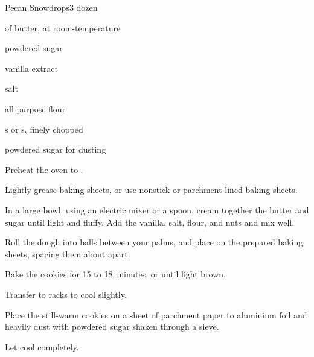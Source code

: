 \begin{recipe}{Pecan Snowdrops}{}{3 dozen}

\begin{ingredients}
\item \C{\threequarter} of butter, at room-temperature
\item \C{\third} powdered sugar
\item {} vanilla extract
\item \tp{\eighth} salt
\item \C{1 \half} all-purpose flour
\item \C{\threequarter}  s or s, finely chopped
\item powdered sugar for dusting
\end{ingredients}

\begin{directions}
\item Preheat the oven to .
\item Lightly grease baking sheets, or use nonstick or parchment-lined baking sheets.
\item In a large bowl, using an electric mixer or a spoon, cream together the butter and sugar until light and fluffy.  Add the vanilla, salt, flour, and nuts and mix well.
\item Roll the dough into \inch{\threequarter} balls between your palms, and place on the prepared baking sheets, spacing them about \inch{1 \half} apart.
\item Bake the cookies for 15 to 18~minutes, or until light brown.
\item Transfer to racks to cool slightly.
\item Place the still-warm cookies on a sheet of parchment paper to aluminium foil and heavily dust with powdered sugar shaken through a sieve.
\item Let cool completely.
\end{directions}

\end{recipe}
